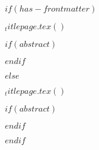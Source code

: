 $if(has-frontmatter)$
\begin{frontmatter}
  
  \begin{titlepage}
    $_titlepage.tex()$
  \end{titlepage}
  
  $if(abstract)$
  \begin{abstract}
    $abstract$
  \end{abstract}
  $endif$
  
\end{frontmatter}

$else$

\begin{titlepage}
  $_titlepage.tex()$
\end{titlepage}
  
$if(abstract)$
\begin{abstract}
  $abstract$
\end{abstract}
$endif$

$endif$